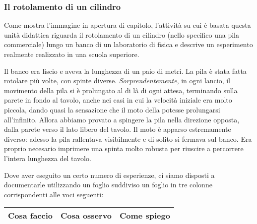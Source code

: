 \subsubsection*{Il rotolamento di un cilindro}

Come mostra l'immagine in apertura di capitolo, l'attività su cui è basata questa unità didattica riguarda il rotolamento di un cilindro (nello specifico una pila commerciale) lungo un banco di un laboratorio di fisica e descrive un esperimento realmente realizzato in una scuola superiore.\newline

Il banco era liscio e aveva la lunghezza di un paio di metri. La pila è stata fatta rotolare più volte, con spinte diverse. {\slshape Sorprendentemente}, in ogni lancio, il movimento della pila si è prolungato al di là di ogni attesa, terminando sulla parete in fondo al tavolo, anche nei casi in cui la velocità iniziale era molto piccola, dando quasi la sensazione che il moto della potesse prolungarsi all'infinito.\newline
Allora abbiamo provato a spingere la pila nella direzione opposta, dalla parete verso il lato libero del tavolo. Il moto è apparso estremamente diverso: adesso la pila rallentava visibilmente e di solito si fermava sul banco. Era proprio necesario imprimere una spinta molto robusta per riuscire a percorrere l'intera lunghezza del tavolo.\newline

Dove aver eseguito un certo numero di esperienze, ci siamo disposti a documentarle utilizzando un foglio suddiviso un foglio in tre colonne corrispondenti alle voci seguenti:\newline

\begin{center}
\begin{tabular}{|c|c|c|}
\hline
{\bf Cosa faccio} &{\bf Cosa osservo }&{\bf Come spiego }\\
\hline
\end{tabular}
\end{center}

